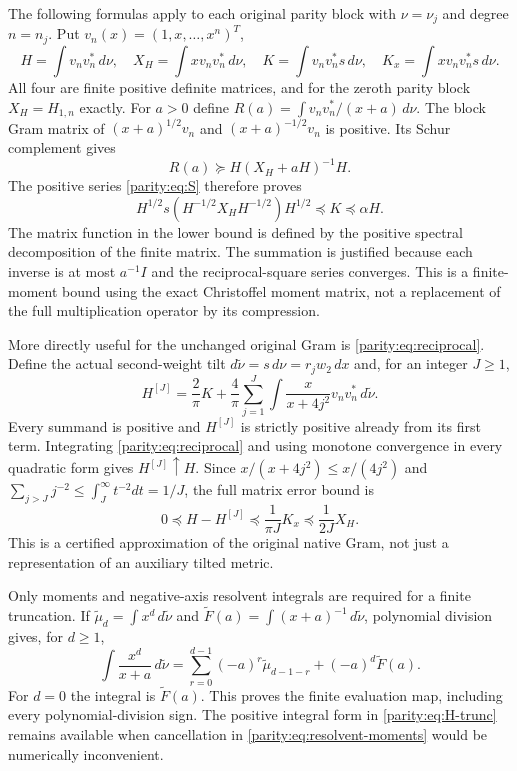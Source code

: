 The following formulas apply to each original parity block with
$\nu=\nu_j$ and degree $n=n_j$. Put $v_n(x)=(1,x,\ldots,x^n)^T$,
\[
 H=\int v_nv_n^*\,d\nu,\quad
 X_H=\int x v_nv_n^*\,d\nu,\quad
 K=\int v_nv_n^*s\,d\nu,\quad
 K_x=\int x v_nv_n^*s\,d\nu.
\]
All four are finite positive definite matrices, and for the
zeroth parity block $X_H=H_{1,n}$ exactly. For $a>0$ define
$R(a)=\int v_nv_n^*/(x+a)\,d\nu$. The block Gram matrix of
$(x+a)^{1/2}v_n$ and $(x+a)^{-1/2}v_n$ is positive. Its Schur
complement gives
\begin{equation}\label{parity:eq:resolvent-compression}
 R(a)\succeq H(X_H+aH)^{-1}H.
\end{equation}
The positive series \eqref{parity:eq:S} therefore proves
\begin{equation}\label{parity:eq:finite-S}
 H^{1/2}s(H^{-1/2}X_HH^{-1/2})H^{1/2}
       \preceq K\preceq\alpha H.
\end{equation}
The matrix function in the lower bound is defined by the positive
spectral decomposition of the finite matrix. The summation is
justified because each inverse is at most $a^{-1}I$ and the
reciprocal-square series converges. This is a finite-moment
bound using the exact Christoffel moment matrix, not a replacement
of the full multiplication operator by its compression.

More directly useful for the unchanged original Gram is
\eqref{parity:eq:reciprocal}. Define the actual second-weight tilt
$d\widetilde\nu=s\,d\nu=r_jw_2\,dx$ and, for an integer $J\geq1$,
\begin{equation}\label{parity:eq:H-trunc}
 H^{[J]}=\frac2\pi K+\frac4\pi\sum_{j=1}^J
       \int\frac{x}{x+4j^2}v_nv_n^*\,d\widetilde\nu.
\end{equation}
Every summand is positive and $H^{[J]}$ is strictly positive
already from its first term. Integrating \eqref{parity:eq:reciprocal}
and using monotone convergence in every quadratic form gives
$H^{[J]}\uparrow H$. Since
$x/(x+4j^2)\leq x/(4j^2)$ and
$\sum_{j>J}j^{-2}\leq\int_J^\infty t^{-2}dt=1/J$, the full
matrix error bound is
\begin{equation}\label{parity:eq:H-error}
 \boxed{0\preceq H-H^{[J]}\preceq\frac1{\pi J}K_x
                                      \preceq\frac1{2J}X_H.}
\end{equation}
This is a certified approximation of the original native Gram,
not just a representation of an auxiliary tilted metric.

Only moments and negative-axis resolvent integrals are required
for a finite truncation. If
$\widetilde\mu_d=\int x^d\,d\widetilde\nu$ and
$\widetilde F(a)=\int(x+a)^{-1}\,d\widetilde\nu$, polynomial
division gives, for $d\geq1$,
\begin{equation}\label{parity:eq:resolvent-moments}
 \int\frac{x^d}{x+a}\,d\widetilde\nu
 =\sum_{r=0}^{d-1}(-a)^r\widetilde\mu_{d-1-r}
                  +(-a)^d\widetilde F(a).
\end{equation}
For $d=0$ the integral is $\widetilde F(a)$. This proves the
finite evaluation map, including every polynomial-division sign.
The positive integral form in \eqref{parity:eq:H-trunc} remains available
when cancellation in \eqref{parity:eq:resolvent-moments} would be
numerically inconvenient.

